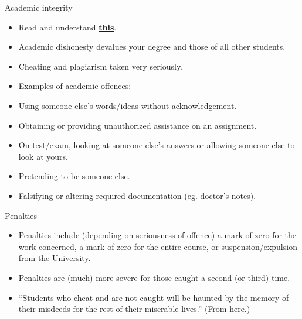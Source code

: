 \documentclass[
  ignorenonframetext,
]{beamer}
\providecommand{\tightlist}{%
  \setlength{\itemsep}{0pt}\setlength{\parskip}{0pt}}
\begin{document}
\begin{frame}{Academic integrity}
\protect\hypertarget{academic-integrity}{}

\begin{itemize}
\tightlist
\item
  Read and understand
  \href{http://www.utoronto.ca/academicintegrity/}{\textbf{this}}.
\item
  Academic dishonesty devalues your degree and those of all other
  students.
\item
  Cheating and plagiarism taken very seriously.
\item
  Examples of academic offences:
\item
  Using someone else's words/ideas without acknowledgement.
\item
  Obtaining or providing unauthorized assistance on an assignment.
\item
  On test/exam, looking at someone else's answers or allowing someone
  else to look at yours.
\item
  Pretending to be someone else.
\item
  Falsifying or altering required documentation (eg. doctor's notes).
\end{itemize}

\end{frame}

\begin{frame}{Penalties}
\protect\hypertarget{penalties}{}

\begin{itemize}
\tightlist
\item
  Penalties include (depending on seriousness of offence) a mark of zero
  for the work concerned, a mark of zero for the entire course, or
  suspension/expulsion from the University.
\item
  Penalties are (much) more severe for those caught a second (or third)
  time.
\item
  ``Students who cheat and are not caught will be haunted by the memory
  of their misdeeds for the rest of their miserable lives.'' (From
  \href{https://philosophy.osu.edu/sites/philosophy.osu.edu/files/1100\%20Brown_2.pdf}{here}.)
\end{itemize}

\end{frame}
\end{document}
